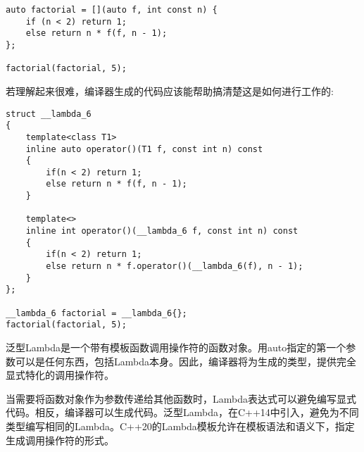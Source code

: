 \begin{lstlisting}[style=styleCXX]
auto factorial = [](auto f, int const n) {
	if (n < 2) return 1;
	else return n * f(f, n - 1);
};

factorial(factorial, 5);
\end{lstlisting}

若理解起来很难，编译器生成的代码应该能帮助搞清楚这是如何进行工作的:

\begin{lstlisting}[style=styleCXX]
struct __lambda_6
{
	template<class T1>
	inline auto operator()(T1 f, const int n) const
	{
		if(n < 2) return 1;
		else return n * f(f, n - 1);
	}

	template<>
	inline int operator()(__lambda_6 f, const int n) const
	{
		if(n < 2) return 1;
		else return n * f.operator()(__lambda_6(f), n - 1);
	}
};

__lambda_6 factorial = __lambda_6{};
factorial(factorial, 5);
\end{lstlisting}

泛型Lambda是一个带有模板函数调用操作符的函数对象。用auto指定的第一个参数可以是任何东西，包括Lambda本身。因此，编译器将为生成的类型，提供完全显式特化的调用操作符。

当需要将函数对象作为参数传递给其他函数时，Lambda表达式可以避免编写显式代码。相反，编译器可以生成代码。泛型Lambda，在C++14中引入，避免为不同类型编写相同的Lambda。C++20的Lambda模板允许在模板语法和语义下，指定生成调用操作符的形式。


